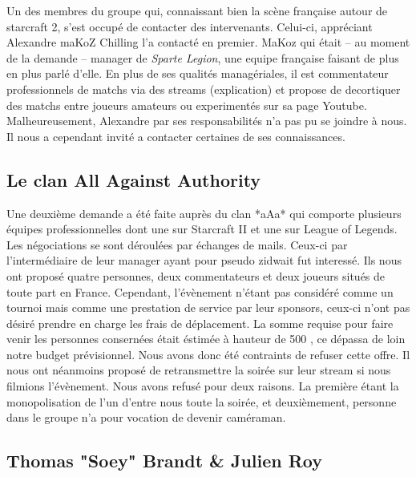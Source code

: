 Un des membres du groupe qui, connaissant bien la scène française autour
de starcraft 2, s'est occupé de contacter des intervenants.  Celui-ci,
appréciant Alexandre \og maKoZ \fg{} Chilling l'a contacté en premier. MaKoz qui
était -- au moment de la demande -- manager de \emph{Sparte Legion}, une equipe
française faisant de plus en plus parlé d'elle. En plus de ses qualités
managériales, il est commentateur professionnels de matchs via des
streams (explication) et propose de decortiquer des matchs entre joueurs
amateurs ou experimentés sur sa page Youtube. Malheureusement, Alexandre
par ses responsabilités n'a pas pu se joindre à nous. Il nous a
cependant invité a contacter certaines de ses connaissances.

\subsection{Le clan All Against Authority}%
\label{sub:le_clan_all_against_authority}

Une deuxième demande a été faite auprès du clan *aAa* qui comporte
plusieurs équipes professionnelles dont une sur Starcraft II et une sur
League of Legends. Les négociations se sont déroulées par échanges de mails.
Ceux-ci par l'intermédiaire de leur manager ayant pour
pseudo \og zidwait \fg{} fut interessé. Ils nous ont proposé quatre personnes,
deux commentateurs et deux joueurs situés de toute part en France.
Cependant, l'évènement n'étant pas considéré comme un tournoi mais comme
une prestation de service par leur sponsors, ceux-ci n'ont pas désiré
prendre en charge les frais de déplacement. La somme requise pour faire
venir les personnes consernées était éstimée à hauteur de 500 \euros, ce
dépassa de loin notre budget prévisionnel. Nous avons donc été
contraints de refuser cette offre. Il nous ont néanmoins proposé de
retransmettre la soirée sur leur stream si nous filmions l'évènement.
Nous avons refusé pour deux raisons. La première étant la monopolisation de l'un
d'entre nous toute la soirée, et deuxièmement, personne dans le groupe n'a pour
vocation de devenir caméraman.

\subsection{Thomas "Soey" Brandt \& Julien Roy}%
\label{sub:thomas_soey_brandt_&_julien_roy}

